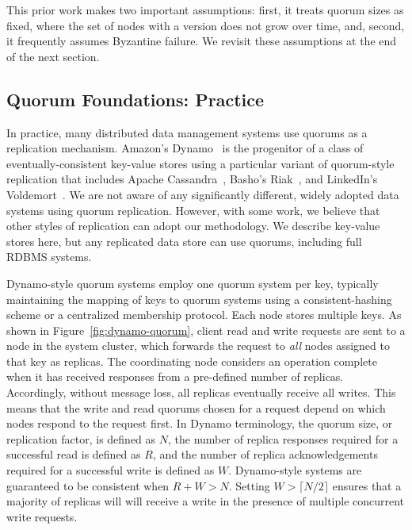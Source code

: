 \documentclass{vldb}
\begin{document}
This prior work makes two important assumptions: first, it treats
quorum sizes as fixed, where the set of nodes with a version does not
grow over time, and, second, it frequently assumes Byzantine failure.
We revisit these assumptions at the end of the next section.

\subsection{Quorum Foundations: Practice}
\label{sec:practice}

In practice, many distributed data management systems use quorums as a
replication mechanism. Amazon's Dynamo~\cite{dynamo} is the progenitor
of a class of eventually-consistent key-value stores using a
particular variant of quorum-style replication that includes Apache
Cassandra~\cite{cassandra, cassandra-sigmod}, Basho's
Riak~\cite{riak}, and LinkedIn's Voldemort~\cite{voldemort,
  voldemortpub}.  We are not aware of any significantly different,
widely adopted data systems using quorum replication.  However, with
some work, we believe that other styles of replication can adopt our
methodology.  We describe key-value stores here, but any replicated
data store can use quorums, including full RDBMS systems.

Dynamo-style quorum systems employ one quorum system per key,
typically maintaining the mapping of keys to quorum systems using a
consistent-hashing scheme or a centralized membership protocol. Each
node stores multiple keys.  As shown in
Figure~\ref{fig:dynamo-quorum}, client read and write requests are
sent to a node in the system cluster, which forwards the request to
\textit{all} nodes assigned to that key as replicas.  The coordinating
node considers an operation complete when it has received responses
from a pre-defined number of replicas.  Accordingly, without message
loss, all replicas eventually receive all writes.  This means that the
write and read quorums chosen for a request depend on which nodes
respond to the request first.  In Dynamo terminology, the quorum size,
or replication factor, is defined as $N$, the number of replica
responses required for a successful read is defined as $R$, and the
number of replica acknowledgements required for a successful write is
defined as $W$. Dynamo-style systems are guaranteed to be consistent
when $R+W > N$.  Setting $W>\lceil N/2 \rceil$ ensures that a majority
of replicas will will receive a write in the presence of multiple
concurrent write requests.
\end{document}
